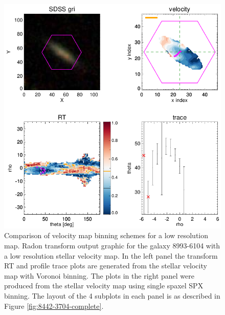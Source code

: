 \begin{figure}
    \includegraphics[width=\columnwidth]{images/RadonPlots/RT-SNIPS-NEW/8993-6104-SPX-MILESHC-MILESHC-1-SNIP.png}
    \caption[Comparison of velocity map binning schemes for a low resolution map]{Comparison of velocity map binning schemes for a low resolution map. Radon transform output graphic for the galaxy 8993-6104 with a low resolution stellar velocity map. In the left panel the transform RT and profile trace plots are generated from the stellar velocity map with Voronoi binning. The plots in the right panel were produced from the stellar velocity map using single spaxel SPX binning. The layout of the 4 subplots in each panel is as described in Figure \ref{fig:8442-3704-complete}.}
    \label{fig:binning-comparison2}
\end{figure}


